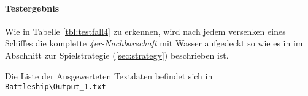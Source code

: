		\paragraph{Testergebnis} %
		\label{par:testergebnis}
			Wie in Tabelle \ref{tbl:testfall4} zu erkennen, wird nach jedem versenken eines Schiffes die komplette \emph{4er-Nachbarschaft} mit Wasser 
			aufgedeckt so wie es in im Abschnitt zur Spielstrategie (\ref{sec:strategy}) beschrieben ist.

			Die Liste der Ausgewerteten Textdaten befindet sich in \texttt{Battle\-ship\textbackslash \-Out\-put\_1.txt}
    